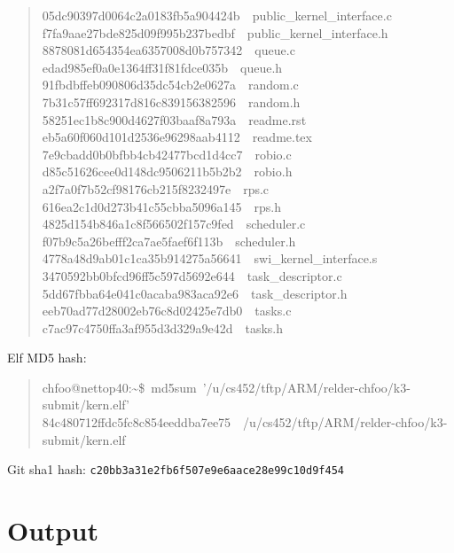 \documentclass[letterpaper]{article}
\begin{document}
\begin{quote}
{05dc90397d0064c2a0183fb5a904424b~~public\_kernel\_interface.c\\
f7fa9aae27bde825d09f995b237bedbf~~public\_kernel\_interface.h\\
8878081d654354ea6357008d0b757342~~queue.c\\
edad985ef0a0e1364ff31f81fdce035b~~queue.h\\
91fbdbffeb090806d35dc54cb2e0627a~~random.c\\
7b31c57ff692317d816c839156382596~~random.h\\
58251ec1b8c900d4627f03baaf8a793a~~readme.rst\\
eb5a60f060d101d2536e96298aab4112~~readme.tex\\
7e9cbadd0b0bfbb4cb42477bcd1d4cc7~~robio.c\\
d85c51626cee0d148dc9506211b5b2b2~~robio.h\\
a2f7a0f7b52cf98176cb215f8232497e~~rps.c\\
616ea2c1d0d273b41c55cbba5096a145~~rps.h\\
4825d154b846a1c8f566502f157c9fed~~scheduler.c\\
f07b9c5a26befff2ca7ae5faef6f113b~~scheduler.h\\
4778a48d9ab01c1ca35b914275a56641~~swi\_kernel\_interface.s\\
3470592bb0bfcd96ff5c597d5692e644~~task\_descriptor.c\\
5dd67fbba64e041c0acaba983aca92e6~~task\_descriptor.h\\
eeb70ad77d28002eb76c8d02425e7db0~~tasks.c\\
c7ac97c4750ffa3af955d3d329a9e42d~~tasks.h
}
\end{quote}

Elf MD5 hash:
%
\begin{quote}{\ttfamily \raggedright \noindent
chfoo@nettop40:\textasciitilde{}\$~md5sum~'/u/cs452/tftp/ARM/relder-chfoo/k3-submit/kern.elf'\\
84c480712ffdc5fc8c854eeddba7ee75~~/u/cs452/tftp/ARM/relder-chfoo/k3-submit/kern.elf
}
\end{quote}

Git sha1 hash: \texttt{c20bb3a31e2fb6f507e9e6aace28e99c10d9f454}


\section{Output%
  \label{output}%
}
\end{document}

